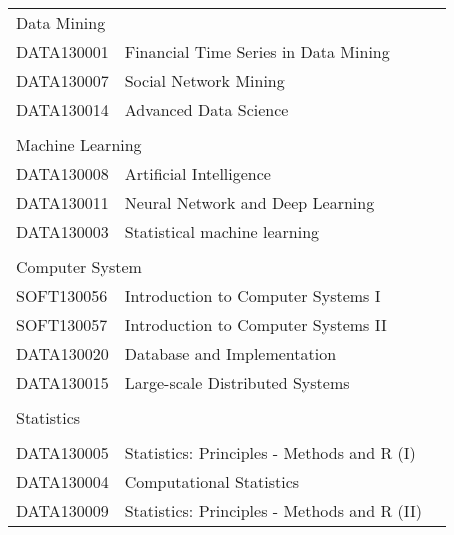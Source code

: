 \begin{table}[]
\begin{tabular}{lll}
\multicolumn{2}{l}{Data Mining}                                   &  \\
DATA130001   & Financial Time Series in Data Mining               &  \\
DATA130007   & Social Network Mining                              &  \\
DATA130014   & Advanced Data Science                              &  \\
             &                                                    &  \\
\multicolumn{2}{l}{Machine Learning}                              &  \\
DATA130008   & Artificial Intelligence                            &  \\
DATA130011   & Neural Network and Deep Learning                   &  \\
DATA130003   & Statistical machine learning                       &  \\
             &                                                    &  \\
\multicolumn{2}{l}{Computer System}                               &  \\
SOFT130056   & Introduction to Computer Systems I                 &  \\
SOFT130057   & Introduction to Computer Systems II                &  \\
DATA130020   & Database and Implementation                        &  \\
DATA130015   & Large-scale Distributed Systems                    &  \\
             &                                                    &  \\
Statistics   &                                                    &  \\
             &                                                    &  \\
DATA130005   & Statistics: Principles - Methods and R (I)         &  \\
DATA130004   & Computational Statistics                           &  \\
DATA130009   & Statistics: Principles - Methods and R (II)        &
\end{tabular}
\end{table}
